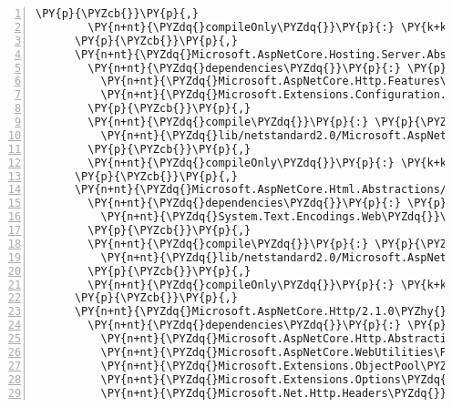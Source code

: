 \begin{Verbatim}[commandchars=\\\{\},numbers=left,firstnumber=1,stepnumber=1,numberblanklines=0]
        \PY{p}{\PYZcb{}}\PY{p}{,}
        \PY{n+nt}{\PYZdq{}compileOnly\PYZdq{}}\PY{p}{:} \PY{k+kc}{true}
      \PY{p}{\PYZcb{}}\PY{p}{,}
      \PY{n+nt}{\PYZdq{}Microsoft.AspNetCore.Hosting.Server.Abstractions/2.1.0\PYZhy{}rc1\PYZhy{}final\PYZdq{}}\PY{p}{:} \PY{p}{\PYZob{}}
        \PY{n+nt}{\PYZdq{}dependencies\PYZdq{}}\PY{p}{:} \PY{p}{\PYZob{}}
          \PY{n+nt}{\PYZdq{}Microsoft.AspNetCore.Http.Features\PYZdq{}}\PY{p}{:} \PY{l+s+s2}{\PYZdq{}2.1.0\PYZhy{}rc1\PYZhy{}final\PYZdq{}}\PY{p}{,}
          \PY{n+nt}{\PYZdq{}Microsoft.Extensions.Configuration.Abstractions\PYZdq{}}\PY{p}{:} \PY{l+s+s2}{\PYZdq{}2.1.0\PYZhy{}rc1\PYZhy{}final\PYZdq{}}
        \PY{p}{\PYZcb{}}\PY{p}{,}
        \PY{n+nt}{\PYZdq{}compile\PYZdq{}}\PY{p}{:} \PY{p}{\PYZob{}}
          \PY{n+nt}{\PYZdq{}lib/netstandard2.0/Microsoft.AspNetCore.Hosting.Server.Abstractions.dll\PYZdq{}}\PY{p}{:} \PY{p}{\PYZob{}}\PY{p}{\PYZcb{}}
        \PY{p}{\PYZcb{}}\PY{p}{,}
        \PY{n+nt}{\PYZdq{}compileOnly\PYZdq{}}\PY{p}{:} \PY{k+kc}{true}
      \PY{p}{\PYZcb{}}\PY{p}{,}
      \PY{n+nt}{\PYZdq{}Microsoft.AspNetCore.Html.Abstractions/2.1.0\PYZhy{}rc1\PYZhy{}final\PYZdq{}}\PY{p}{:} \PY{p}{\PYZob{}}
        \PY{n+nt}{\PYZdq{}dependencies\PYZdq{}}\PY{p}{:} \PY{p}{\PYZob{}}
          \PY{n+nt}{\PYZdq{}System.Text.Encodings.Web\PYZdq{}}\PY{p}{:} \PY{l+s+s2}{\PYZdq{}4.5.0\PYZhy{}rc1\PYZdq{}}
        \PY{p}{\PYZcb{}}\PY{p}{,}
        \PY{n+nt}{\PYZdq{}compile\PYZdq{}}\PY{p}{:} \PY{p}{\PYZob{}}
          \PY{n+nt}{\PYZdq{}lib/netstandard2.0/Microsoft.AspNetCore.Html.Abstractions.dll\PYZdq{}}\PY{p}{:} \PY{p}{\PYZob{}}\PY{p}{\PYZcb{}}
        \PY{p}{\PYZcb{}}\PY{p}{,}
        \PY{n+nt}{\PYZdq{}compileOnly\PYZdq{}}\PY{p}{:} \PY{k+kc}{true}
      \PY{p}{\PYZcb{}}\PY{p}{,}
      \PY{n+nt}{\PYZdq{}Microsoft.AspNetCore.Http/2.1.0\PYZhy{}rc1\PYZhy{}final\PYZdq{}}\PY{p}{:} \PY{p}{\PYZob{}}
        \PY{n+nt}{\PYZdq{}dependencies\PYZdq{}}\PY{p}{:} \PY{p}{\PYZob{}}
          \PY{n+nt}{\PYZdq{}Microsoft.AspNetCore.Http.Abstractions\PYZdq{}}\PY{p}{:} \PY{l+s+s2}{\PYZdq{}2.1.0\PYZhy{}rc1\PYZhy{}final\PYZdq{}}\PY{p}{,}
          \PY{n+nt}{\PYZdq{}Microsoft.AspNetCore.WebUtilities\PYZdq{}}\PY{p}{:} \PY{l+s+s2}{\PYZdq{}2.1.0\PYZhy{}rc1\PYZhy{}final\PYZdq{}}\PY{p}{,}
          \PY{n+nt}{\PYZdq{}Microsoft.Extensions.ObjectPool\PYZdq{}}\PY{p}{:} \PY{l+s+s2}{\PYZdq{}2.1.0\PYZhy{}rc1\PYZhy{}final\PYZdq{}}\PY{p}{,}
          \PY{n+nt}{\PYZdq{}Microsoft.Extensions.Options\PYZdq{}}\PY{p}{:} \PY{l+s+s2}{\PYZdq{}2.1.0\PYZhy{}rc1\PYZhy{}final\PYZdq{}}\PY{p}{,}
          \PY{n+nt}{\PYZdq{}Microsoft.Net.Http.Headers\PYZdq{}}\PY{p}{:} \PY{l+s+s2}{\PYZdq{}2.1.0\PYZhy{}rc1\PYZhy{}final\PYZdq{}}

\end{Verbatim}
